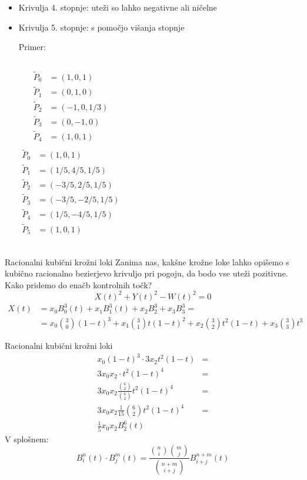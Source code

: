 \documentclass[t]{beamer}
\begin{document}
\begin{frame}
\begin{itemize}
\item Krivulja 4. stopnje: uteži so lahko negativne ali ničelne
\item Krivulja 5. stopnje: s pomočjo višanja stopnje

Primer:
\begin{columns}
	\begin{align*}
	\tilde{P}_0 &= (1,0, 1)\\
	\tilde{P}_1 &= (0, 1, 0)\\
	\tilde{P}_2 &= (-1, 0, 1/3)\\
	\tilde{P}_3 &= (0, -1, 0)\\
	\tilde{P}_4 &= (1, 0, 1) \\
	\end{align*}
    \begin{align*}
	\tilde{P}_0 &= (1,0, 1)\\
	\tilde{P}_1 &= (1/5, 4/5, 1/5)\\
	\tilde{P}_2 &= (-3/5, 2/5, 1/5)\\
	\tilde{P}_3 &= (-3/5, -2/5, 1/5)\\
	\tilde{P}_4 &= (1/5, -4/5, 1/5)\\
	\tilde{P}_5 &= (1, 0, 1) \\
	\end{align*}
\end{columns}

\end{itemize}
\end{frame}

\begin{frame}{Racionalni kubični krožni loki}
Zanima nas, kakšne krožne loke lahko opišemo s kubično racionalno bezierjevo krivuljo pri pogoju, da bodo vse uteži pozitivne.
Kako pridemo do enačb kontrolnih točk?
$$
X(t)^2 + Y(t)^2 - W(t)^2 = 0
$$
\begin{align*}
X(t) &= x_{0} B_{0}^3 (t) + x_{1} B_{1}^3 (t) + x_{2} B_{2}^3 + x_{3} B_{3}^3 = \\
&= x_{0} \binom{3}{0} (1-t)^3 + x_{1} \binom{3}{1} t(1-t)^2 + x_{2} \binom{3}{2} t^2(1-t) + x_{3} \binom{3}{3} t^3
\end{align*}
\end{frame}

\begin{frame}{Racionalni kubični krožni loki}
\begin{align*}
x_{0}(1-t)^3 \cdot 3x_{2}t^2(1-t) &= \\
3x_{0} x_{2} \cdot t^2 (1-t)^4 & = \\
3x_{0}x_{2} \frac{\binom{6}{2}}{\binom{6}{2}} t^2 (1-t)^4 &= \\
3x_{0}x_{2} \frac{1}{15} \binom{6}{2} t^2 (1-t)^4 &= \\
\frac{1}{5} x_{0}x_{2} B_{2}^6(t)
\end{align*}
V splošnem:
$$
B_{i}^{n}(t) \cdot B_{j}^{m}(t) = \frac{\binom{n}{i} \binom{m}{j}}{\binom{n+m}{i+j}}B_{i+j}^{n+m}(t)
$$
\end{frame}
\end{document}
